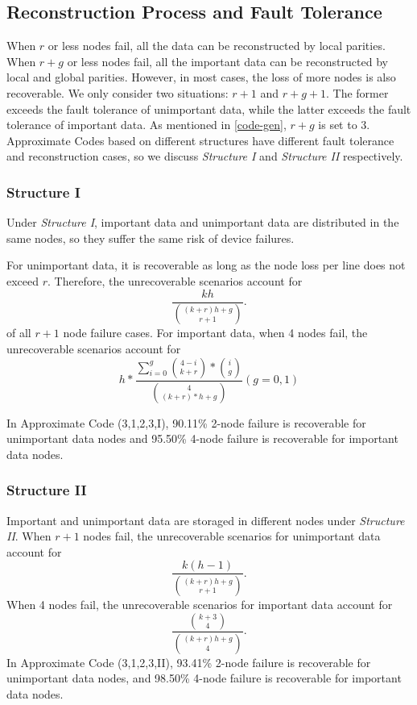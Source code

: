 \documentclass[sigconf]{acmart}
\begin{document}
\subsection{Reconstruction Process and Fault Tolerance}\label{ReconstructionFT}
When $r$ or less nodes fail, all the data can be reconstructed by local parities.
When $r+g$ or less nodes fail, all the important data can be reconstructed by local and global parities.
However, in most cases, the loss of more nodes is also recoverable. We only consider two situations: $r+1$ and $r+g+1$. 
The former exceeds the fault tolerance of unimportant data, while the latter exceeds the fault tolerance of important data. As mentioned in \ref{code-gen}, $r+g$ is set to 3.
Approximate Codes based on different structures have different fault tolerance and reconstruction cases, so we discuss \emph{Structure I} and \emph{Structure II} respectively. 

\subsubsection{Structure I}
Under \emph{Structure I}, important data and unimportant data are distributed in the same nodes, so they suffer the same risk of device failures. 

For unimportant data, it is recoverable as long as the node loss per line does not exceed $r$. Therefore, the unrecoverable scenarios account for
$$\frac{kh}{\binom{(k+r)h+g}{r+1}}.$$
of all $r+1$ node failure cases. 
For important data, when 4 nodes fail, the unrecoverable scenarios account for
$$h*\frac{\sum_{i=0}^{g} {\binom{4-i}{k+r}*\binom{i}{g}} }{\binom{4}{(k+r)*h+g}}  (g=0,1)$$

In Approximate Code (3,1,2,3,I), 90.11\% 2-node failure is recoverable for unimportant data nodes and 95.50\% 4-node failure is recoverable for important data nodes.

\subsubsection{Structure II}
Important and unimportant data are storaged in different nodes under \emph{Structure II}.
When $r+1$ nodes fail, the unrecoverable scenarios for unimportant data account for
$$\frac{k(h-1)}{\binom{(k+r)h+g}{r+1}}.$$
When 4 nodes fail, the unrecoverable scenarios for important data account for
$$\frac{\binom{k+3}{4}}{\binom{(k+r)h+g}{4}}.$$
In Approximate Code (3,1,2,3,II), 93.41\% 2-node failure is recoverable for unimportant data nodes, and 98.50\% 4-node failure is recoverable for important data nodes.
\end{document}
